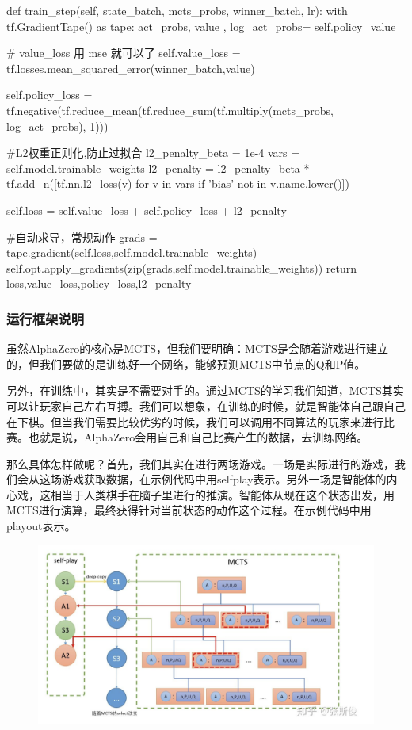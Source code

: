 \documentclass[12pt]{article}
\begin{document}
\begin{python}
def train_step(self, state_batch, mcts_probs, winner_batch, lr):
    with tf.GradientTape() as tape:           
        act_probs, value , log_act_probs= self.policy_value

        # value_loss 用 mse 就可以了
        self.value_loss = tf.losses.mean_squared_error(winner_batch,value)

        self.policy_loss = tf.negative(tf.reduce_mean(tf.reduce_sum(tf.multiply(mcts_probs, log_act_probs), 1)))

        #L2权重正则化,防止过拟合
        l2_penalty_beta = 1e-4
        vars = self.model.trainable_weights
        l2_penalty = l2_penalty_beta * tf.add_n([tf.nn.l2_loss(v) for v in vars if 'bias' not in v.name.lower()])

        self.loss = self.value_loss + self.policy_loss + l2_penalty

    #自动求导，常规动作
    grads = tape.gradient(self.loss,self.model.trainable_weights)
    self.opt.apply_gradients(zip(grads,self.model.trainable_weights))
    return loss,value_loss,policy_loss,l2_penalty
\end{python}

\subsubsection{运行框架说明}
虽然AlphaZero的核心是MCTS，但我们要明确：MCTS是会随着游戏进行建立的，但我们要做的是训练好一个网络，能够预测MCTS中节点的Q和P值。

另外，在训练中，其实是不需要对手的。通过MCTS的学习我们知道，MCTS其实可以让玩家自己左右互搏。我们可以想象，在训练的时候，就是智能体自己跟自己在下棋。但当我们需要比较优劣的时候，我们可以调用不同算法的玩家来进行比赛。也就是说，AlphaZero会用自己和自己比赛产生的数据，去训练网络。

那么具体怎样做呢？首先，我们其实在进行两场游戏。一场是实际进行的游戏，我们会从这场游戏获取数据，在示例代码中用selfplay表示。另外一场是智能体的内心戏，这相当于人类棋手在脑子里进行的推演。智能体从现在这个状态出发，用MCTS进行演算，最终获得针对当前状态的动作这个过程。在示例代码中用playout表示。

\begin{figure}[H]
    \centering
    \includegraphics[width=.4\textwidth]{fig/ReinforcementLearning/AlphaZero_Framework.png}
\end{figure}
\end{document}
